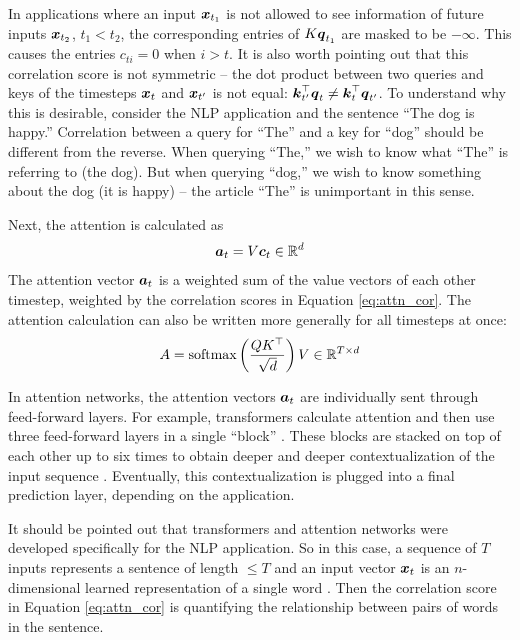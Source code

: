 In applications where an input $\boldsymbol{x}_{t_1}$ is not allowed to see information of future inputs $\boldsymbol{x}_{t_2}$, $t_1<t_2$, the corresponding entries of $K\boldsymbol{q}_{t_1}$ are masked to be $-\infty$. This causes the entries $c_{ti} = 0$ when $i > t$. It is also worth pointing out that this correlation score is not symmetric -- the dot product between two queries and keys of the timesteps $\boldsymbol{x}_t$ and $\boldsymbol{x}_{t'}$ is not equal: $\boldsymbol{k}_{t'}^\top \boldsymbol{q}_t \not = \boldsymbol{k}_t^\top \boldsymbol{q}_{t'}$. To understand why this is desirable, consider the NLP application and the sentence ``The dog is happy.'' Correlation between a query for ``The'' and a key for ``dog'' should be different from the reverse. When querying ``The,'' we wish to know what ``The'' is referring to (the dog). But when querying ``dog,'' we wish to know something about the dog (it is happy) -- the article ``The'' is unimportant in this sense.

Next, the attention is calculated as 
\begin{equation}
  \boldsymbol{a}_t = V \boldsymbol{c}_t \in \mathbb{R}^d
  \label{eq:attn}
\end{equation}
The attention vector $\boldsymbol{a}_t$ is a weighted sum of the value vectors of each other timestep, weighted by the correlation scores in Equation \ref{eq:attn_cor}. The attention calculation can also be written more generally for all timesteps at once:
\begin{equation}
  A = \text{softmax}\left(\frac{QK^\top}{\sqrt{d}} \right) V \in \mathbb{R}^{T \times d}
  \label{eq:attn_matrix}
\end{equation}

In attention networks, the attention vectors $\boldsymbol{a}_t$ are individually sent through feed-forward layers. For example, transformers calculate attention and then use three feed-forward layers in a single ``block'' \cite{vaswani2017}. These blocks are stacked on top of each other up to six times to obtain deeper and deeper contextualization of the input sequence \cite{dai2019}. Eventually, this contextualization is plugged into a final prediction layer, depending on the application.

It should be pointed out that transformers and attention networks were developed specifically for the NLP application. So in this case, a sequence of $T$ inputs represents a sentence of length $\leq T$ and an input vector $\boldsymbol{x}_t$ is an $n$-dimensional learned representation of a single word \cite{mikolov2013}. Then the correlation score in Equation \ref{eq:attn_cor} is quantifying the relationship between pairs of words in the sentence.



